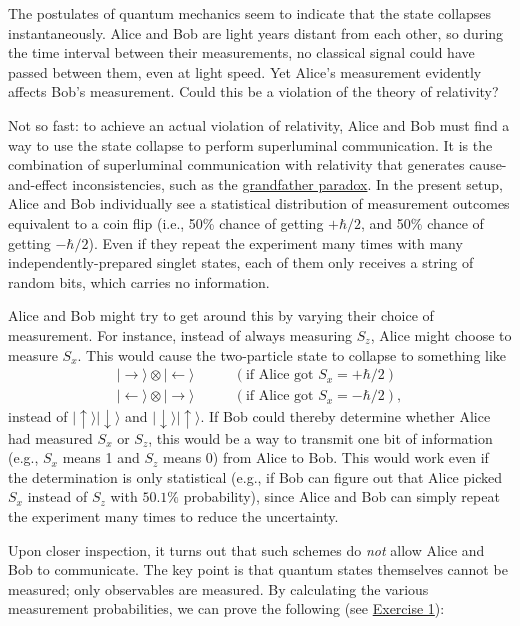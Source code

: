 \documentclass[prx,12pt]{revtex4-2}
\begin{document}
The postulates of quantum mechanics seem to indicate that the state
collapses instantaneously.  Alice and Bob are light years distant from
each other, so during the time interval between their measurements, no
classical signal could have passed between them, even at light speed.
Yet Alice's measurement evidently affects Bob's measurement.  Could
this be a violation of the theory of relativity?

Not so fast: to achieve an actual violation of relativity, Alice and
Bob must find a way to use the state collapse to perform superluminal
communication.  It is the combination of superluminal communication
with relativity that generates cause-and-effect inconsistencies, such
as the
\href{https://en.wikipedia.org/wiki/Temporal_paradox#Grandfather_paradox}{grandfather
  paradox}.  In the present setup, Alice and Bob individually see a
statistical distribution of measurement outcomes equivalent to a coin
flip (i.e., 50\% chance of getting $+\hbar/2$, and 50\% chance of
getting $-\hbar/2$).  Even if they repeat the experiment many times
with many independently-prepared singlet states, each of them only
receives a string of random bits, which carries no information.

Alice and Bob might try to get around this by varying their choice of
measurement.  For instance, instead of always measuring $S_z$, Alice
might choose to measure $S_x$.  This would cause the two-particle
state to collapse to something like
\begin{align*}
  |\!\rightarrow\rangle \otimes |\!\leftarrow\rangle &\qquad(\textrm{if Alice got $S_x = +\hbar/2$}) \\
  |\!\leftarrow\rangle \otimes |\!\rightarrow\rangle &\qquad(\textrm{if Alice got $S_x = -\hbar/2$}),
\end{align*}
instead of $|\!\uparrow\rangle |\!\downarrow\rangle$ and
$|\!\downarrow\rangle |\!\uparrow\rangle$.  If Bob could thereby
determine whether Alice had measured $S_x$ or $S_z$, this would be a
way to transmit one bit of information (e.g., $S_x$ means 1 and $S_z$
means 0) from Alice to Bob.  This would work even if the determination
is only statistical (e.g., if Bob can figure out that Alice picked
$S_x$ instead of $S_z$ with $50.1\%$ probability), since Alice and Bob
can simply repeat the experiment many times to reduce the uncertainty.

Upon closer inspection, it turns out that such schemes do \textit{not}
allow Alice and Bob to communicate.  The key point is that quantum
states themselves cannot be measured; only observables are measured.
By calculating the various measurement probabilities, we can prove the
following (see \hyperref[ex:singletproperties]{Exercise 1}):
\end{document}
